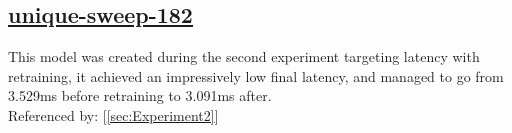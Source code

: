 \documentclass[11pt]{report}
\begin{document}
\subsection*{\protect\href{https://wandb.ai/samfh/Resnet56-Channels-Filters/runs/ptmmklr8?workspace=}{\underline{\color{blue}unique-sweep-182}}}\label{sec:unique-sweep-182}
This model was created during the second experiment targeting latency with retraining, it achieved an impressively low final latency, and managed to go from 3.529ms before retraining to 3.091ms after.\\
Referenced by: [\ref{sec:Experiment2}]
\begin{figure}[H]
    \begin{table}[H]
        \centering
        \hspace{2em}
    \end{table}    
\end{figure}
\end{document}
